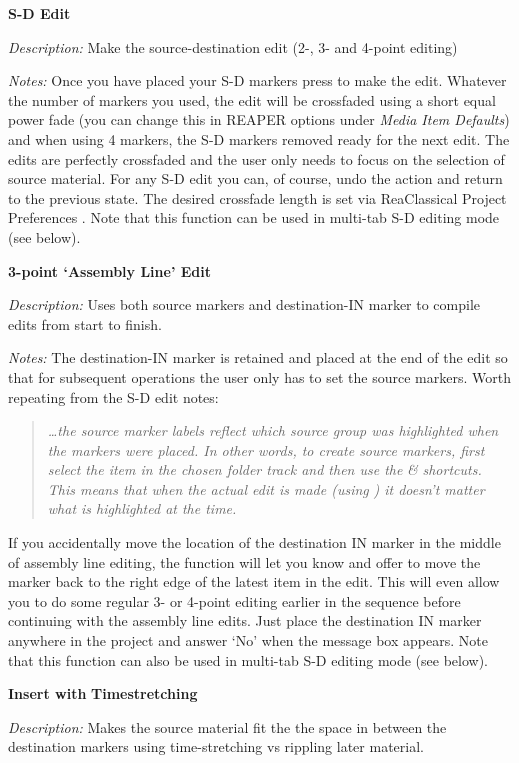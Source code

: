 \documentclass[10pt,american]{article}
\begin{document}
\textbf{S-D Edit }

\emph{Description:} Make the source-destination edit (2-, 3- and 4-point
editing)

\emph{Notes: }Once you have placed your S-D markers press  to make the
edit. Whatever the number of markers you used, the edit will be crossfaded using
a short equal power fade (you can change this in REAPER options under
\emph{Media Item Defaults}) and when using 4 markers, the S-D markers removed
ready for the next edit. The edits are perfectly crossfaded and the user only
needs to focus on the selection of source material. For any S-D edit you can, of
course, undo the action and return to the previous state. The desired crossfade
length is set via ReaClassical Project Preferences  . Note that this
function can be used in multi-tab S-D editing mode (see below).

\textbf{3-point `Assembly Line' Edit }

\emph{Description:} Uses both source markers and destination-IN marker to
compile edits from start to finish.

\emph{Notes: }The destination-IN marker is retained and placed at the end of the
edit so that for subsequent operations the user only has to set the source
markers. Worth repeating from the S-D edit notes: 
\begin{quote}
\emph{\dots the source marker labels reflect which source group was highlighted
when the markers were placed. In other words, to create source markers, first
select the item in the chosen folder track and then use the }\emph{ \&
}\emph{ shortcuts. This means that when the actual edit is made (using
} \emph{) it doesn't matter what is highlighted at the time.}
\end{quote}
If you accidentally move the location of the destination IN marker in the middle
of assembly line editing, the function will let you know and offer to move the
marker back to the right edge of the latest item in the edit. This will even
allow you to do some regular 3- or 4-point editing earlier in the sequence
before continuing with the assembly line edits. Just place the destination IN
marker anywhere in the project and answer `No' when the message box appears.
Note that this function can also be used in multi-tab S-D editing mode (see
below).

\textbf{Insert with }\textbf{Timestretching}\textbf{ }

\emph{Description: }Makes the source material fit the the space in between the
destination markers using time-stretching vs rippling later material.
\end{document}
